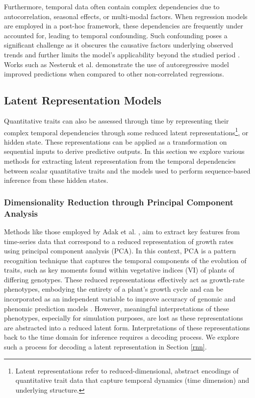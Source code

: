 \documentclass{article}
\begin{document}
Furthermore, temporal data often contain complex dependencies due to autocorrelation, seasonal effects, or multi-modal factors. When regression models are employed in a post-hoc framework, these dependencies are frequently under accounted for, leading to temporal confounding. Such confounding poses a significant challenge as it obscures the causative factors underlying observed trends and further limits the model's applicability beyond the studied period \cite{shumway2000time}. Works such as Nesteruk et al. \cite{Sergey9152399} demonstrate the use of autoregressive model improved predictions when compared to other non-correlated regressions.



\subsection{Latent Representation Models}
Quantitative traits can also be assessed through time by representing their complex temporal dependencies through some reduced latent representations\footnote{Latent representations refer to reduced-dimensional, abstract encodings of quantitative trait data that capture temporal dynamics (time dimension) and underlying structure.}, or hidden state. 
These representations can be applied as a transformation on sequential inputs to derive predictive outputs. In this section we explore various methods for extracting latent representation from the temporal dependencies between scalar quantitative traits and the models used to perform sequence-based inference from these hidden states.

\subsubsection{Dimensionality Reduction through Principal Component Analysis}
Methods like those employed by Adak et al. \cite{1jkae092FPCA}, aim to extract key features from time-series data that correspond to a reduced representation of growth rates using principal component analysis (PCA). In this context, PCA is a pattern recognition technique that captures the temporal components of the evolution of traits, such as key moments found within vegetative indices (VI) of plants of differing genotypes. These reduced representations effectively act as growth-rate phenotypes, embodying the entirety of a plant's growth cycle and can be incorporated as an independent variable to improve accuracy of genomic and phenomic prediction models \cite{bimj.202000315}. However, meaningful interpretations of these phenotypes, especially for simulation purposes, are lost as these representations are abstracted into a reduced latent form. Interpretations of these representations back to the time domain for inference requires a decoding process. We explore such a process for decoding a latent representation in Section \ref{rnn}. 
\end{document}
